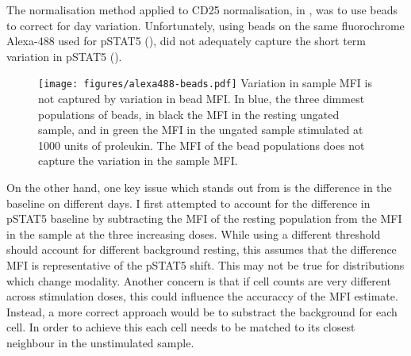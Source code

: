 The normalisation method applied to CD25 normalisation,
in , was to use beads to correct for day variation.
Unfortunately, using beads on the same fluorochrome Alexa-488 used for pSTAT5 (),
did not adequately capture the short term variation in pSTAT5 ().  
\begin{figure}[h]
    \centering
    \texttt{[image: figures/alexa488-beads.pdf]}
    {Variation in sample MFI is not captured by variation in bead MFI.}
    {
      In blue, the three dimmest populations of beads, in black the \gls{MFI} in the resting ungated sample, and in green the MFI in the ungated
      sample stimulated at 1000 units of proleukin.
      The MFI of the bead populations does not capture the variation in the sample MFI.
    }
\end{figure} 
On the other hand, one key issue which stands out from  is the difference in the baseline
on different days.
I first attempted to account for the difference in pSTAT5 baseline by subtracting the MFI of the resting population from the MFI in the sample at the three increasing doses.
While using a different threshold should account for different background resting, this assumes that the difference MFI is representative
of the pSTAT5 shift.
This may not be true for distributions which change modality.
Another concern is that if cell counts are very different across stimulation doses, this could influence the accuraccy of the MFI estimate.
Instead, a more correct approach would be to substract the background for each cell.
In order to achieve this each cell needs to be matched to its closest neighbour in the unstimulated sample.

